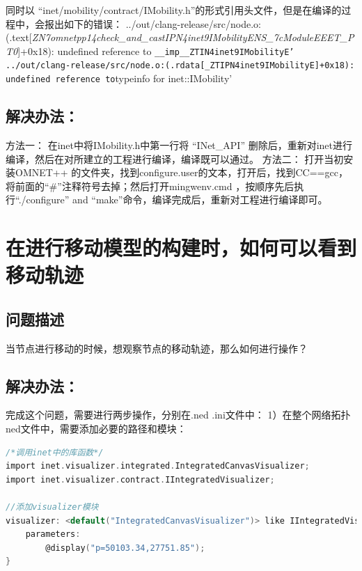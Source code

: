 同时以 ``inet\slash mobility\slash contract\slash IMobility.h''的形式引用头文件，但是在编译的过程中，会报出如下的错误：
..\slash out\slash clang-release\slash src\slash node.o:(.text{[\emph{ZN7omnetpp14check\_and\_castIPN4inet9IMobilityENS\_7cModuleEEET\_PT0}]}+0x18): undefined reference to \texttt{\_\_imp\_\_ZTIN4inet9IMobilityE'
..\slash out\slash clang-release\slash src\slash node.o:(.rdata[\_ZTIPN4inet9IMobilityE]+0x18): undefined reference to}typeinfo for inet::IMobility'

\subsection{解决办法：}
\label{解决办法：}

方法一：
在inet中将IMobility.h中第一行将 ``INet\_API'' 删除后，重新对inet进行编译，然后在对所建立的工程进行编译，编译既可以通过。
方法二：
打开当初安装OMNET++ 的文件夹，找到configure.user的文本，打开后，找到CC==gcc，将前面的“\#”注释符号去掉；然后打开mingwenv.cmd
，按顺序先后执行``.\slash configure'' and ``make''命令，编译完成后，重新对工程进行编译即可。

\section{在进行移动模型的构建时，如何可以看到移动轨迹}
\label{在进行移动模型的构建时，如何可以看到移动轨迹}

\subsection{问题描述}
\label{问题描述}

当节点进行移动的时候，想观察节点的移动轨迹，那么如何进行操作？

\subsection{解决办法：}
\label{解决办法：}

完成这个问题，需要进行两步操作，分别在.ned .ini文件中：
1）在整个网络拓扑ned文件中，需要添加必要的路径和模块：

\begin{lstlisting}[language=c]
/*调用inet中的库函数*/
import inet.visualizer.integrated.IntegratedCanvasVisualizer;
import inet.visualizer.contract.IIntegratedVisualizer;

//添加visualizer模块
visualizer: <default("IntegratedCanvasVisualizer")> like IIntegratedVisualizer if hasVisualizer() {
    parameters:
        @display("p=50103.34,27751.85");
}
\end{lstlisting}

